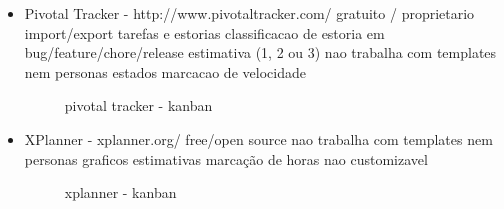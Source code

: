 \begin{itemize}
\item Pivotal Tracker - http://www.pivotaltracker.com/
gratuito / proprietario
import/export tarefas e estorias
classificacao de estoria em bug/feature/chore/release
estimativa (1, 2 ou 3)
nao trabalha com templates nem personas
estados
marcacao de velocidade

\begin{figure}[htbp]
  \centering
  \caption{pivotal tracker - kanban}
\end{figure}

\item XPlanner - xplanner.org/
free/open source
nao trabalha com templates nem personas
graficos
estimativas
marcação de horas
nao customizavel

\begin{figure}[htbp]
  \centering
  \caption{xplanner - kanban}
\end{figure}


\end{itemize}
